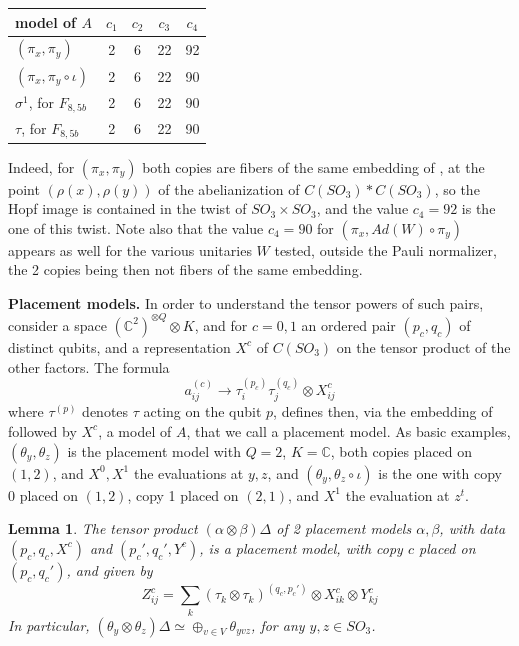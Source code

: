 \documentclass[11pt]{amsart}
\newtheorem{lemma}[theorem]{Lemma}
\begin{document}
\medskip

\begin{center}
\begin{tabular}{lcccc}
\toprule
model of $A$ & $c_1$ & $c_2$ & $c_3$ & $c_4$\\
\midrule
$(\pi_x,\pi_y)$ & 2 & 6 & 22 & 92\\
$(\pi_x,\pi_y\circ\iota)$ & 2 & 6 & 22 & 90\\
$\sigma^1$, for $F_{8,5b}$ & 2 & 6 & 22 & 90\\
$\tau$, for $F_{8,5b}$ & 2 & 6 & 22 & 90\\
\bottomrule
\end{tabular}
\end{center}

\medskip

\noindent Indeed, for $(\pi_x,\pi_y)$ both copies are fibers of the same embedding of \cite[Theorem 5.1]{bb2}, at the point $(\rho(x),\rho(y))$ of the abelianization of $C(SO_3)*C(SO_3)$, so the Hopf image is contained in the twist of $SO_3\times SO_3$, and the value $c_4=92$ is the one of this twist. Note also that the value $c_4=90$ for $(\pi_x,Ad(W)\circ\pi_y)$ appears as well for the various unitaries $W$ tested, outside the Pauli normalizer, the 2 copies being then not fibers of the same embedding.

\medskip

\noindent\textbf{Placement models.} In order to understand the tensor powers of such pairs, consider a space $(\mathbb C^2)^{\otimes Q}\otimes K$, and for $c=0,1$ an ordered pair $(p_c,q_c)$ of distinct qubits, and a representation $X^c$ of $C(SO_3)$ on the tensor product of the other factors. The formula
$$a^{(c)}_{ij}\to\tau_i^{(p_c)}\tau_j^{(q_c)}\otimes X^c_{ij}$$
where $\tau^{(p)}$ denotes $\tau$ acting on the qubit $p$, defines then, via the embedding of \cite[Theorem 5.1]{bb2} followed by $X^c$, a model of $A$, that we call a placement model. As basic examples, $(\theta_y,\theta_z)$ is the placement model with $Q=2$, $K=\mathbb C$, both copies placed on $(1,2)$, and $X^0,X^1$ the evaluations at $y,z$, and $(\theta_y,\theta_z\circ\iota)$ is the one with copy 0 placed on $(1,2)$, copy 1 placed on $(2,1)$, and $X^1$ the evaluation at $z^t$.

\begin{lemma}\label{lem:placement}
The tensor product $(\alpha\otimes\beta)\Delta$ of 2 placement models $\alpha,\beta$, with data $(p_c,q_c,X^c)$ and $(p_c',q_c',Y^c)$, is a placement model, with copy $c$ placed on $(p_c,q_c')$, and given by
$$Z^c_{ij}=\sum_k(\tau_k\otimes\tau_k)^{(q_c,p_c')}\otimes X^c_{ik}\otimes Y^c_{kj}$$
In particular, $(\theta_y\otimes\theta_z)\Delta\simeq\oplus_{v\in V}\theta_{yvz}$, for any $y,z\in SO_3$.
\end{lemma}
\end{document}
